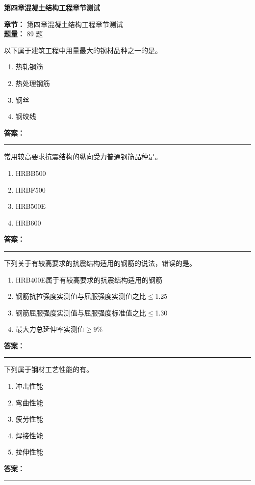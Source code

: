 \documentclass[UTF8,fontset=fandol,11pt]{ctexart}
\newcommand{\chaptertitle}[1]{\vspace{0.5em}\begin{tcolorbox}[enhanced,colback=deepblue,colframe=deepblue,arc=2mm,boxrule=0pt]\begin{center}\Large\bfseries\color{white}#1\end{center}\end{tcolorbox}\vspace{0.5em}}
\newcommand{\answerline}{\textcolor{answerred}{\rule{2.4cm}{0.7pt}}}
\begin{document}
\chaptertitle{第四章混凝土结构工程章节测试}
\begin{mainbox}
\textbf{\textcolor{mainblue}{章节：}} 第四章混凝土结构工程章节测试\\
\textbf{\textcolor{answerred}{题量：}} 89 题
\end{mainbox}

\begin{quizbox}[title={第 1 题}]
以下属于建筑工程中用量最大的钢材品种之一的是。\\
\begin{enumerate}[label=\Alph*.]
\item 热轧钢筋
\item 热处理钢筋
\item 钢丝
\item 钢绞线
\end{enumerate}
\textbf{\textcolor{answerred}{答案：}} \answerline
\end{quizbox}

\begin{quizbox}[title={第 2 题}]
常用较高要求抗震结构的纵向受力普通钢筋品种是。\\
\begin{enumerate}[label=\Alph*.]
\item HRBB500
\item HRBF500
\item HRB500E
\item HRB600
\end{enumerate}
\textbf{\textcolor{answerred}{答案：}} \answerline
\end{quizbox}

\begin{quizbox}[title={第 3 题}]
下列关于有较高要求的抗震结构适用的钢筋的说法，错误的是。\\
\begin{enumerate}[label=\Alph*.]
\item HRB400E属于有较高要求的抗震结构适用的钢筋
\item 钢筋抗拉强度实测值与屈服强度实测值之比$\leq$1.25
\item 钢筋屈服强度实测值与屈服强度标准值之比$\leq$1.30
\item 最大力总延伸率实测值$\geq$9\%
\end{enumerate}
\textbf{\textcolor{answerred}{答案：}} \answerline
\end{quizbox}

\begin{quizbox}[title={第 4 题}]
下列属于钢材工艺性能的有。\\
\begin{enumerate}[label=\Alph*.]
\item 冲击性能
\item 弯曲性能
\item 疲劳性能
\item 焊接性能
\item 拉伸性能
\end{enumerate}
\textbf{\textcolor{answerred}{答案：}} \answerline
\end{quizbox}
\end{document}
